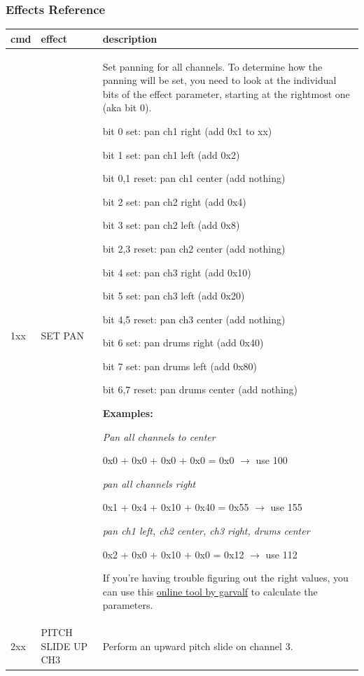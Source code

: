 \documentclass[12pt]{report}	%
\begin{document}
\newpage
\subsubsection{Effects Reference}
\label{sec:fx}

\begin{longtable}{p{} p{} p{}}
\textbf{cmd} & \textbf{effect} & \textbf{description} \\
\hline
1xx & SET PAN & Set panning for all channels. To determine how the panning will be set, you need to look at the individual bits of the effect parameter, starting at the rightmost one (aka bit 0). \newline

bit 0 set: pan ch1 right (add 0x1 to xx)

bit 1 set: pan ch1 left (add 0x2)

bit 0,1 reset: pan ch1 center (add nothing)

bit 2 set: pan ch2 right (add 0x4)

bit 3 set: pan ch2 left (add 0x8)

bit 2,3 reset: pan ch2 center (add nothing)

bit 4 set: pan ch3 right (add 0x10)

bit 5 set: pan ch3 left (add 0x20)

bit 4,5 reset: pan ch3 center (add nothing)

bit 6 set: pan drums right (add 0x40)

bit 7 set: pan drums left (add 0x80)

bit 6,7 reset: pan drums center (add nothing) \newline

\textbf{Examples:} \newline

\emph{Pan all channels to center}

0x0 + 0x0 + 0x0 + 0x0 = 0x0 $\rightarrow$ use 100 \newline

\emph{pan all channels right}

0x1 + 0x4 + 0x10 + 0x40 = 0x55 $\rightarrow$ use 155 \newline

\emph{pan ch1 left, ch2 center, ch3 right, drums center}

0x2 + 0x0 + 0x10 + 0x0 = 0x12 $\rightarrow$ use 112 \newline

If you're having trouble figuring out the right values, you can use this \href{http://garvalf.online.fr/temp/ht2_panning.html}{online tool by garvalf} to calculate the parameters. \\
\hline
2xx & PITCH SLIDE UP CH3 & Perform an upward pitch slide on channel 3.


\end{longtable}
\end{document}
